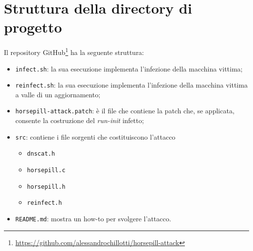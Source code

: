\documentclass[oneside]{article}
\begin{document}
\section{Struttura della directory di progetto}
Il repository GitHub\footnote{\url{https://github.com/alessandrochillotti/horsepill-attack}} ha la seguente struttura:
\begin{itemize}
\item \texttt{infect.sh}: la sua esecuzione implementa l'infezione della macchina vittima;
\item \texttt{reinfect.sh}: la sua esecuzione implementa l'infezione della macchina vittima a valle di un aggiornamento;
\item \texttt{horsepill-attack.patch}: è il file che contiene la patch che, se applicata, consente la costruzione del \textit{run-init} infetto;
\item \texttt{src}: contiene i file sorgenti che costituiscono l'attacco
\begin{itemize}
\item \texttt{dnscat.h}
\item \texttt{horsepill.c}
\item \texttt{horsepill.h}
\item \texttt{reinfect.h}
\end{itemize}
\item \texttt{README.md}: mostra un how-to per svolgere l'attacco.
\end{itemize}
\end{document}
